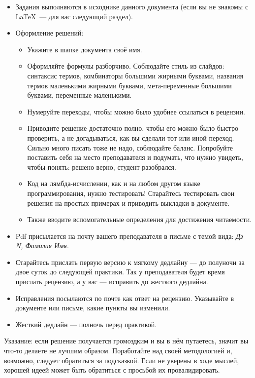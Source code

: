 \documentclass{article}
\begin{document}
    \begin{itemize}
        \item Задания выполняются в исходнике данного документа (если вы не знакомы с \LaTeX~--- для вас следующий раздел).
        \item Оформление решений:
        \begin{itemize}
            \item Укажите в шапке документа своё имя.
            \item Оформляйте формулы разборчиво.
            Соблюдайте стиль из слайдов: синтаксис термов, комбинаторы большими жирными буквами, названия термов маленькими жирными буквами, мета-переменные большими буквами, переменные маленькими.
            \item Нумеруйте переходы, чтобы можно было удобнее ссылаться в рецензии.
            \item Приводите решение достаточно полно, чтобы его можно было быстро проверить, а не догадываться, как вы сделали тот или иной переход.
            Сильно много писать тоже не надо, соблюдайте баланс.
            Попробуйте поставить себя на место преподавателя и подумать, что нужно увидеть, чтобы понять: решено верно, студент разобрался.
            \item Код на лямбда-исчислении, как и на любом другом языке программирования, нужно тестировать!
            Старайтесь тестировать свои решения на простых примерах и приводить выкладки в документе.
            \item Также вводите вспомогательные определения для достижения читаемости.
        \end{itemize}
        \item Pdf присылается на почту вашего преподавателя в письме с темой вида: \textit{Дз N, Фамилия Имя}.
        \item Старайтесь прислать первую версию к мягкому дедлайну --- до полуночи за двое суток до следующей практики.
        Так у преподавателя будет время прислать рецензию, а у вас --- исправить до жесткого дедлайна.
        \item Исправления посылаются по почте как ответ на рецензию.
        Указывайте в документе или письме, какие пункты вы изменили.
        \item Жесткий дедлайн --- полночь перед практикой.
    \end{itemize}

    Указание: если решение получается громоздким и вы в нём путаетесь, значит вы что-то делаете не лучшим образом.
    Поработайте над своей методологией и, возможно, следует обратиться за подсказкой.
    Если не уверены в ходе мыслей, хорошей идеей может быть обратиться с просьбой их провалидировать.
\end{document}
